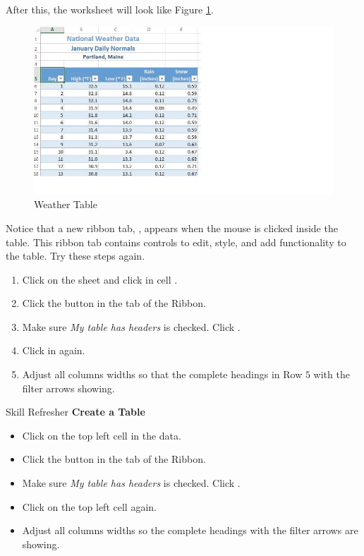 After this, the worksheet will look like Figure \ref{05:fig03}.

\begin{figure}[H]
	\centering
	\includegraphics[width=\maxwidth{.95\linewidth}]{gfx/ch05_fig03}
	\caption{Weather Table}
	\label{05:fig03}
\end{figure}

Notice that a new ribbon tab, , appears when the mouse is clicked inside the table. This ribbon tab contains controls to edit, style, and add functionality to the table. Try these steps again.

\begin{enumerate}
	\item Click on the  sheet and click in cell .
	\item Click the  button in the  tab of the Ribbon.
	\item Make sure \textit{My table has headers} is checked. Click .
	\item Click in  again.
	\item Adjust all columns widths so that the complete headings in Row $ 5 $ with the filter arrows showing.
\end{enumerate}

\begin{center}
	\begin{sklbox}{Skill Refresher}
		\textbf{Create a Table}
		\\
		\begin{itemize}
			\setlength{\itemsep}{0pt}
			\setlength{\parskip}{0pt}
			\setlength{\parsep}{0pt}

			\item Click on the top left cell in the data.
			\item Click the  button in the  tab of the Ribbon.
			\item Make sure \textit{My table has headers} is checked. Click .
			\item Click on the top left cell again.
			\item Adjust all columns widths so the complete headings with the filter arrows are showing.
						
		\end{itemize}
	\end{sklbox}
\end{center}

